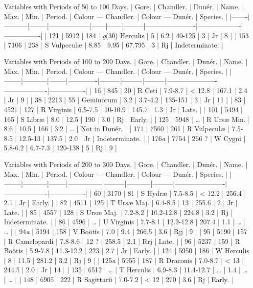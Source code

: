 \documentclass[a4paper, 12pt, oneside, polutonikogreek, english]{article}
\begin{document}
Variables with Periods of 50 to 100 Days. 
| Gore. | Chandler. | Dunér. | Name.      | Max. | Min. | Period. | Colour --- Chandler. | Colour --- Dunér. | Species.    |
|-------|-----------|--------|------------------|------|------|---------|----------------------|-------------------|----------------|
| 121  | 5912   | 184  | \emph{g}(30) Herculis | 5  | 6.2 | 40-125 | 3          | Jr        | 8       |
| 153  | 7106   | 238  | S Vulpeculæ   | 8.85 | 9.95 | 67.795 | 3          | Rj        | Indeterminate. |

Variables with Periods of 100 to 200 Days. 
| Gore. | Chandler. | Dunér. | Name.    | Max.  | Min.  | Period. | Colour --- Chandler. | Colour --- Dunér. | Species.    |
|--------|-----------|--------|-------------|---------|---------|---------|----------------------|-------------------|----------------|
| 16   | 845    | 20   | R Ceti   | 7.9-8.7 | < 12.8 | 167.1  | 2.4         | Jr        | 9       |
| 38   | 2213   | 55   | Geminorum  | 3.2   | 3.7-4.2 | 135-151 | 3          | Jr        | 11       |
| 83   | 4521   | 127  | R Virginis | 6.5-7.5 | 10-10.9 | 145.7  | 1.3         | Jr        | Late.     |
| 101  | 5494   | 165  | S Libræ   | 8.0   | 12.5  | 190   | 3.0         | Rj        | Early.     |
| 125  | 5948   | …   | R Ursæ Min. | 8.6   | 10.5  | 166   | 3.2         | …         | Not in Dunér. |
| 171  | 7560   | 261  | R Vulpeculæ | 7.5-8.5 | 12.5-13 | 137.5  | 2.0         | Jr        | Indeterminate. |
| 176\emph{a} | 7754   | 266 ? | W Cygni   | 5.8-6.2 | 6.7-7.3 | 120-138 | 5          | Rj        | 9       |

Variables with Periods of 200 to 300 Days. 
| Gore. | Chandler. | Dunér. | Name.     | Max.  | Min.   | Period. | Colour --- Chandler. | Colour --- Dunér. | Species.    |
|--------|-----------|--------|---------------|---------|-----------|---------|----------------------|-------------------|----------------|
| 60   | 3170   | 81   | S Hydræ    | 7.5-8.5 | < 12.2  | 256.4  | 2.1         | Jr        | Early.     |
| 82   | 4511   | 125  | T Ursæ Maj.  | 6.4-8.5 | 13    | 255.6  | 2          | Jr        | Late.     |
| 85   | 4557   | 128  | S Ursæ Maj.  | 7.2-8.2 | 10.2-12.8 | 224.8  | 3.2         | Rj        | Indeterminate. |
| 86   | 4596   | …   | U Virginis  | 7.7-8.1 | 12.2-12.8 | 207.4  | 1.1         | …         | …       |
| 94\emph{a} | 5194   | 158  | V Boötis   | 7.0   | 9.4    | 266.5  | 3.6         | Rjj        | 9       |
| 95   | 5190   | 157  | R Camelopardi | 7.8-8.6 | 12 ?   | 258.5  | 2.1         | Rrj        | Late.     |
| 96   | 5237   | 159  | R Boötis   | 5.9-7.8 | 11.3-12.2 | 223   | 2.7         | Jr        | Early.     |
| 124  | 5950   | 186  | W Herculis  | 8    | 11.5   | 281.2  | 3.2         | Rj        | 9       |
| 125\emph{a} | 5955   | 187  | R Draconis  | 7.0-8.7 | < 13   | 244.5  | 2.0         | Jr        | 14       |
| 135  | 6512   | …   | T Herculis  | 6.9-8.3 | 11.4-12.7 | …    | 1.4         | …         | …       |
| 148  | 6905   | 222  | R Sagittarii | 7.0-7.2 | < 12   | 270   | 3.6         | Rj        | Early.     |
\end{document}
